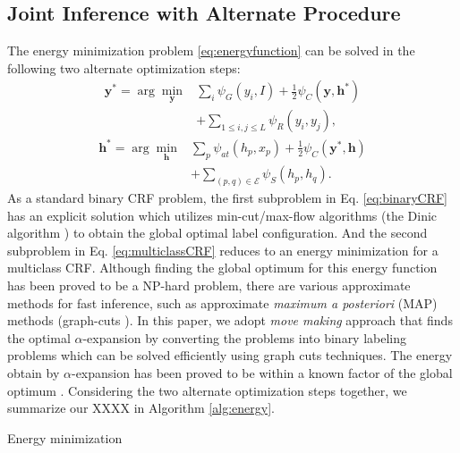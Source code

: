\subsection{Joint Inference with Alternate Procedure}
The energy minimization problem \eqref{eq:energyfunction} can be solved in the following two alternate optimization steps:
\begin{equation}
    \label{eq:binaryCRF}
    \begin{aligned}
        \boldsymbol{y}^* = \arg\min_{\boldsymbol{y}} &\sum_{i} {\psi_{G}(y_i,I)} + \frac{1}{2} \psi_{C}(\boldsymbol{y},\boldsymbol{h}^*) \\ &+ \sum_{1 \le i,j \le L} {\psi_{R}(y_i,y_j)},
    \end{aligned}
\end{equation}
\begin{equation}
    \label{eq:multiclassCRF}
    \begin{aligned}
        \boldsymbol{h}^* = \arg\min_{\boldsymbol{h}} &\sum_{p} {\psi_{at}(h_p,x_p)} + \frac{1}{2} \psi_{C}(\boldsymbol{y}^*,\boldsymbol{h}) \\ &+ \sum_{(p,q) \in \mathcal{E}}{\psi_{S}(h_p,h_q)}.
    \end{aligned}
\end{equation}
As a standard binary CRF problem, the first subproblem in Eq. \eqref{eq:binaryCRF} has an explicit solution which utilizes min-cut/max-flow algorithms (\eg the Dinic algorithm \cite{dinits1970algorithm}) to obtain the global optimal label configuration. And the second subproblem in Eq. \eqref{eq:multiclassCRF} reduces to an energy minimization for a multiclass CRF. Although finding the global optimum for this energy function has been proved to be a NP-hard problem, there are various approximate methods for fast inference, such as approximate \textit{maximum a posteriori} (MAP) methods (\eg graph-cuts \cite{boykov2001fast}). In this paper, we adopt \textit{move making} approach \cite{boykov2001fast} that finds the optimal $\alpha$-expansion \cite{boykov2001fast,kolmogorov2004energy} by converting the problems into binary labeling  problems which can be solved efficiently using graph cuts techniques. The energy obtain by $\alpha$-expansion has been proved to be within a known factor of the global optimum \cite{boykov2001fast}. Considering the two alternate optimization steps together, we summarize our XXXX in Algorithm \ref{alg:energy}.


\begin{algorithm}[htb]
    \caption{ Energy minimization }
    \label{alg:energy}
    \begin{algorithmic}[1]
    \end{algorithmic}
\end{algorithm}



